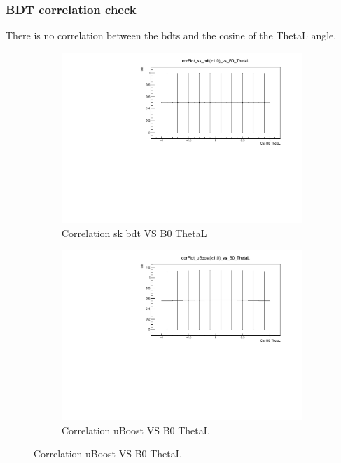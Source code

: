 \documentclass{beamer}
\begin{document}
\begin{frame}
\frametitle{BDT correlation check}
There is no correlation between the bdts and the cosine of the ThetaL angle.
 \begin{figure}
 \centering
 \begin{subfigure}{0.5\textwidth}
 \centering
 \includegraphics[width=1.0\linewidth]{plots/corPlot_sk_bdt(<1.0)_vs_B0_ThetaL.pdf}
 \caption{Correlation sk bdt VS B0 ThetaL}
 \end{subfigure}%
\begin{subfigure}{0.5\textwidth}
\centering
\includegraphics[width=1.0\linewidth]{plots/corPlot_uBoost(<1.0)_vs_B0_ThetaL.pdf}
\caption{Correlation uBoost VS B0 ThetaL}
\end{subfigure}
\end{figure}
\end{frame}
\end{document}
